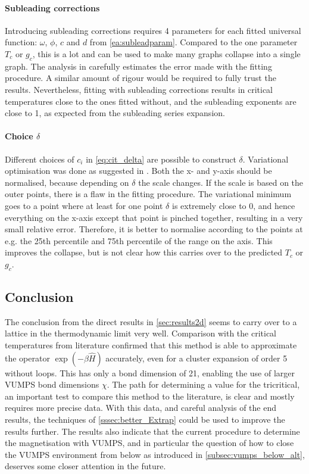 \paragraph{Subleading corrections}
Introducing subleading corrections requires 4 parameters for each fitted universal function: $\omega$, $\phi$, $c$ and $d$ from \cref{ea:subleadparam}. Compared to the one parameter $T_c$ or $g_c$, this is a lot and can be used to make many graphs collapse into a single graph. The analysis in \cite{Wang2006} carefully estimates the error made with the fitting procedure. A similar amount of rigour would be required to fully trust the results. Nevertheless, fitting with subleading corrections results in critical temperatures close to the ones fitted without, and the subleading exponents are close to 1, as expected from the subleading series expansion.

\paragraph{ Choice  $\delta$  }

Different choices of $c_i$ in \cref{eq:cit_delta} are possible to construct $\delta$.  Variational optimisation was done as suggested in \cite{Nietner2020}. Both the x- and y-axis should be normalised, because depending on $\delta$ the scale changes. If the scale is based on the outer points, there is a flaw in the fitting procedure.  The variational minimum goes to a point where at least for one point $\delta$ is extremely close to 0, and hence everything on the x-axis except that point is pinched together, resulting in a very small relative error. Therefore, it is better to normalise according to the points at e.g. the 25th percentile and 75th percentile of the range on the  axis. This improves the collapse, but is not clear how this carries over to the predicted  $T_c$ or $g_c$.

\subsection{Conclusion}

The conclusion from the direct results in \cref{sec:results2d} seems to carry over to a lattice in the thermodynamic limit very well. Comparison with the critical temperatures from literature confirmed that this method is able to approximate the operator $\exp(-\beta \hat{H})$ accurately, even for a cluster expansion of order 5 without loops. This has only a bond dimension of 21, enabling the use of larger \Gls{VUMPS} bond dimensions $\chi$.
The path for determining a value for the tricritical, an important test  to compare this method to the literature, is clear and mostly requires more precise data. With this data, and careful analysis of the end results, the techniques of \cref{sssec:better_Extrap} could be used to improve  the results further. The results also indicate that the current procedure to determine the magnetisation with \Gls{VUMPS}, and in particular the question of how to close the \Gls{VUMPS} environment from below as introduced in \cref{subsec:vumps_below_alt}, deserves some closer attention in the future.